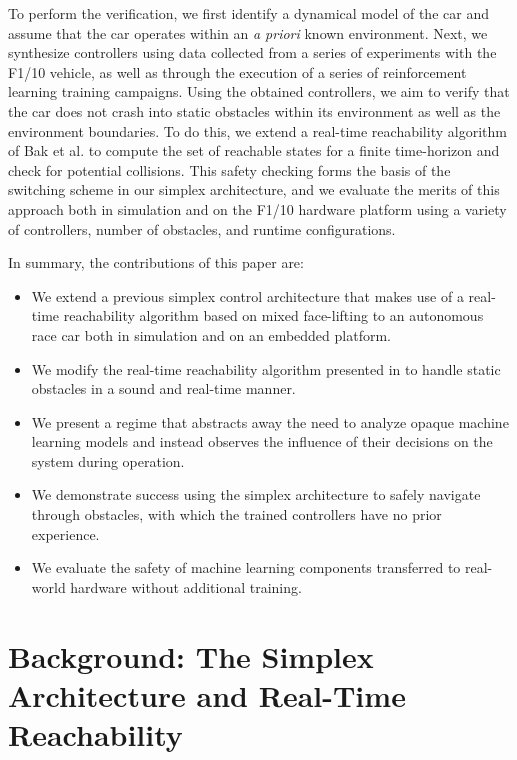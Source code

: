 \documentclass[manuscript,screen,review]{acmart}
\begin{document}
To perform the verification, we first identify a dynamical model of the car and assume that the car operates within an \textit{a priori} known environment. Next, we synthesize controllers using data collected from a series of experiments with the F1/10 vehicle, as well as through the execution of a series of reinforcement learning training campaigns. Using the obtained controllers, we aim to verify that the car does not crash into static obstacles within its environment as well as the environment boundaries. To do this, we extend a real-time reachability algorithm of Bak et al. \cite{Bak2014,Johnson2016} to compute the set of reachable states for a finite time-horizon and check for potential collisions. This safety checking forms the basis of the switching scheme in our simplex architecture, and we evaluate the merits of this approach both in simulation and on the F1/10 hardware platform using a variety of controllers, number of obstacles, and runtime configurations.

In summary, the contributions of this paper are: \raggedbottom
\begin{itemize}%
    \item We extend a previous simplex control architecture that makes use of a real-time reachability algorithm based on mixed face-lifting to an autonomous race car both in simulation and on an embedded platform.
    \item We modify the real-time reachability algorithm presented in \cite{Bak2014} to handle static obstacles in a sound and real-time manner.
    \item We present a regime that abstracts away the need to analyze opaque machine learning models and instead observes the influence of their decisions on the system during operation.
    \item We demonstrate success using the simplex architecture to safely navigate through obstacles, with which the trained controllers have no prior experience.
    \item We evaluate the safety of machine learning components transferred to real-world hardware without additional training.
    
\end{itemize}%



\section{Background: The Simplex Architecture and Real-Time Reachability}
\end{document}
